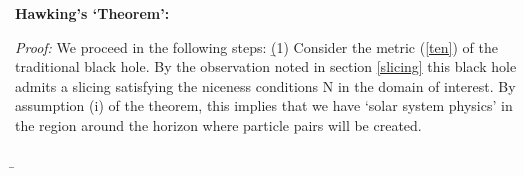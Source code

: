 \documentclass[12pt]{article}
\begin{document}
{\bf Hawking's `Theorem':}

\b
\b

{\it Proof:} \quad We proceed in the following steps:
\b


(1) Consider the metric (\ref{ten}) of the traditional black hole. By the observation noted in section  \ref{slicing} this black hole admits a slicing satisfying the niceness conditions N in the domain of interest. By assumption (i) of the theorem, this implies that we have `solar system physics' in the region around the horizon where particle pairs will be created.

\b
\end{document}
